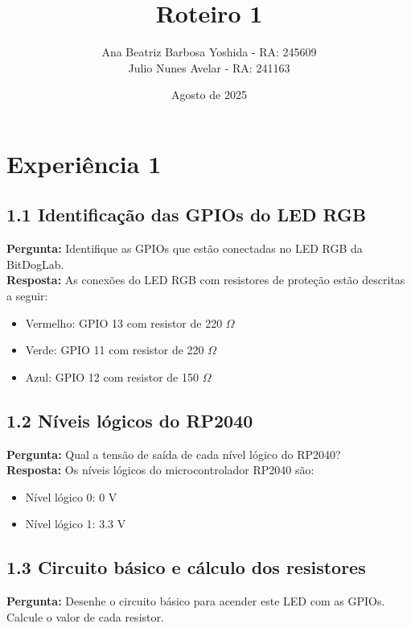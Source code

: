 \documentclass{article}
\title{Roteiro 1}
\author{Ana Beatriz Barbosa Yoshida - RA: 245609 \\ Julio Nunes Avelar - RA: 241163}
\date{Agosto de 2025}
\begin{document}
\maketitle

\tableofcontents
\newpage

\section{Experiência 1}

\subsection{1.1 Identificação das GPIOs do LED RGB}
\textbf{Pergunta:} Identifique as GPIOs que estão conectadas no LED RGB da BitDogLab. \\


\textbf{Resposta:} As conexões do LED RGB com resistores de proteção estão descritas a seguir:  
\begin{itemize}
    \item Vermelho: GPIO 13 com resistor de 220 $\Omega$
    \item Verde: GPIO 11 com resistor de 220 $\Omega$
    \item Azul: GPIO 12 com resistor de 150 $\Omega$
\end{itemize}

\subsection{1.2 Níveis lógicos do RP2040}
\textbf{Pergunta:} Qual a tensão de saída de cada nível lógico do RP2040? \\

\textbf{Resposta:} Os níveis lógicos do microcontrolador RP2040 são:  
\begin{itemize}
    \item Nível lógico 0: 0 V
    \item Nível lógico 1: 3.3 V
\end{itemize}

\subsection{1.3 Circuito básico e cálculo dos resistores}
\textbf{Pergunta:} Desenhe o circuito básico para acender este LED com as GPIOs. Calcule o valor de cada resistor. \\
\end{document}
